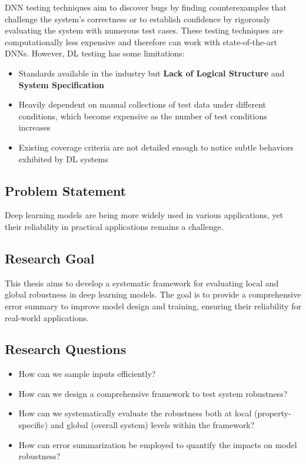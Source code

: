 DNN testing techniques aim to discover bugs by finding counterexamples that challenge the system's correctness or to establish confidence by rigorously evaluating the system with numerous test cases. These testing techniques are computationally less expensive and therefore can work with state-of-the-art DNNs. However, DL testing has some limitations:
\begin{itemize}
    \item Standards available in the industry but \textbf{Lack of Logical Structure} and \textbf{System Specification}
    \item Heavily dependent on manual collections of test data under different conditions, which become expensive as the number of test conditions increases
    \item Existing coverage criteria are not detailed enough to notice subtle behaviors exhibited by DL systems
\end{itemize}

\subsection{Problem Statement}

Deep learning models are being more widely used in various applications, yet their reliability in practical applications remains a challenge.

\subsection{Research Goal}

This thesis aims to develop a systematic framework for evaluating local and global robustness in deep learning models. The goal is to provide a comprehensive error summary to improve model design and training, ensuring their reliability for real-world applications.

\subsection{Research Questions}\hypertarget{researchquestions}{}
\begin{itemize}
	\item How can we sample inputs efficiently?
	\item How can we design a comprehensive framework to test system robustness?
    \item How can we systematically evaluate the robustness both at local (property-specific) and global (overall system) levels within the framework?
    \item How can error summarization be employed to quantify the impacts on model robustness?
\end{itemize}

